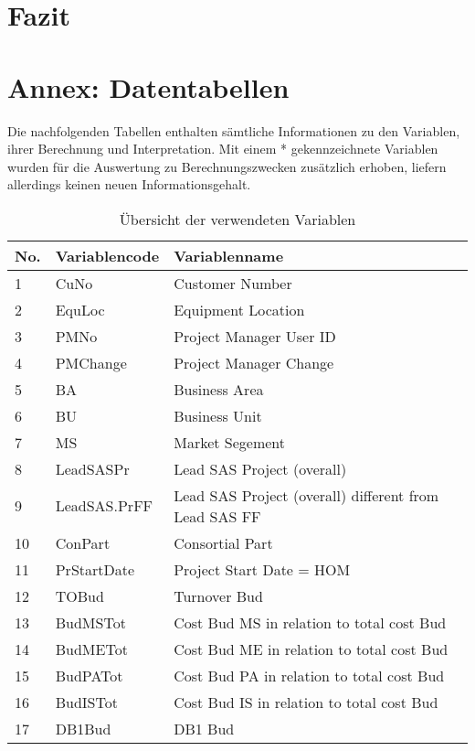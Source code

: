 
\section{Fazit}
\section*{Annex: Datentabellen}\label{sec:annex}
Die nachfolgenden Tabellen enthalten sämtliche Informationen zu den Variablen, ihrer Berechnung und Interpretation. Mit einem * gekennzeichnete Variablen wurden für die Auswertung zu Berechnungszwecken zusätzlich erhoben, liefern allerdings keinen neuen Informationsgehalt. 
\begin{longtable}[ht]{p{} p{}p{}}
	\caption{Übersicht der verwendeten Variablen}\\
		\textbf{No.} & \textbf{Variablencode} & \textbf{Variablenname} \\\hline\endhead
    1     & CuNo  & Customer Number \\
2     & EquLoc & Equipment Location \\
3     & PMNo  & Project Manager User ID \\
4     & PMChange & Project Manager Change \\
5     & BA    & Business Area \\
6     & BU    & Business Unit \\
7     & MS    & Market Segement \\
8     & LeadSASPr & Lead SAS Project (overall) \\
9     & LeadSAS.PrFF & Lead SAS Project (overall) different from Lead SAS FF \\
10    & ConPart & Consortial Part \\
11    & PrStartDate & Project Start Date = HOM \\
12    & TOBud & Turnover Bud \\
13    & BudMSTot & Cost Bud MS in relation to total cost Bud \\
14    & BudMETot & Cost Bud ME in relation to total cost Bud  \\
15    & BudPATot & Cost Bud PA in relation to total cost Bud \\
16    & BudISTot & Cost Bud IS in relation to total cost Bud \\
17    & DB1Bud & DB1 Bud \\

\end{longtable}
